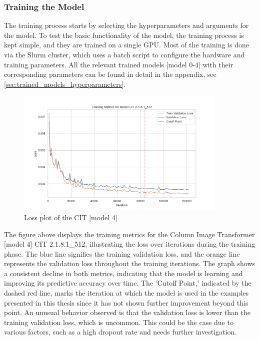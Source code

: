         

    \subsubsection{Training the Model}

    The training process starts by selecting the hyperparameters and arguments for the model. To test the basic functionality of the model, the training process is kept simple, and they are trained on a single GPU. Most of the training is done via the Slurm cluster, which uses a batch script to configure the hardware and training parameters. All the relevant trained models [model 0-4] with their corresponding parameters can be found in detail in the appendix, see \autoref{sec:trained_models_hyperparameters}.
    
    \begin{figure}[H]
        \centering
        \includegraphics[width=0.9\textwidth]{imgs/Training_Metrics_CIT 2.1.8.1_512.png}
        \caption{Loss plot of the CIT [model 4]}
        \label{fig:Training_Metrics_CIT512}
    \end{figure}

    The figure above displays the training metrics for the Column Image Transformer [model 4] CIT 2.1.8.1\_512, illustrating the loss over iterations during the training phase. The blue line signifies the training validation loss, and the orange line represents the validation loss throughout the training iterations. The graph shows a consistent decline in both metrics, indicating that the model is learning and improving its predictive accuracy over time. The 'Cutoff Point,' indicated by the dashed red line, marks the iteration at which the model is used in the examples presented in this thesis since it has not shown further improvement beyond this point. An unusual behavior observed is that the validation loss is lower than the training validation loss, which is uncommon. This could be the case due to various factors, such as a high dropout rate and needs further investigation.

